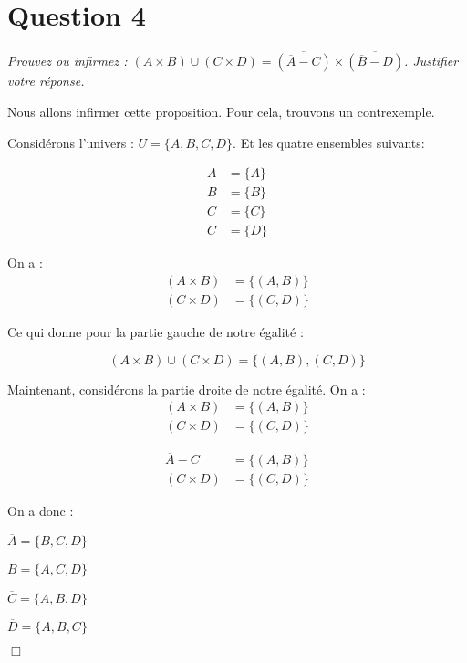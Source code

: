 \section*{Question 4}

\emph{Prouvez ou infirmez : \((A \times B) \cup (C \times D) = \overline{(\overline{A} - C)} \times  \overline{(\overline{B} - D)} \). Justifier votre réponse.}

\bigskip
Nous allons infirmer cette proposition. Pour cela, trouvons un contrexemple.

\medskip
Considérons l’univers : \(U = \{A, B, C, D\}\). Et les quatre ensembles suivants:

\begin{align*}
	A & = \{A\} \\
	B & = \{B\} \\
	C & = \{C\} \\
	C & = \{D\}
\end{align*}

\medskip
On a :
\begin{align*}
	(A \times B) & = \{(A, B)\} \\
	(C \times D) & = \{(C, D)\}
\end{align*}



\medskip
Ce qui donne pour la partie gauche de notre égalité :

\[(A \times B) \cup (C \times D) = \{(A, B), (C, D)\}\]

\smallskip
Maintenant, considérons la partie droite de notre égalité. On a : 
\begin{align*}
	(A \times B) & = \{(A, B)\} \\
	(C \times D) & = \{(C, D)\}
\end{align*}


\begin{align*}
	\overline{A} -C & = \{(A, B)\} \\
	(C \times D) & = \{(C, D)\}
\end{align*}


\smallskip
On a donc :

\(\overline{A} = \{B, C, D\}\)

\(\overline{B} = \{A, C, D\}\)

\(\overline{C} = \{A, B, D\}\)

\(\overline{D} = \{A, B, C\}\)
\begin{flushright}
	$\Box$
\end{flushright}